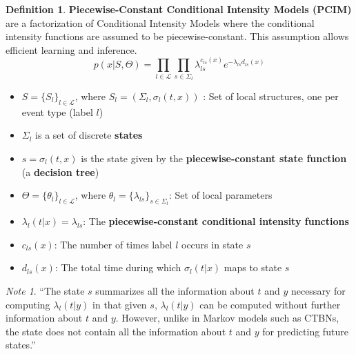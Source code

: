 \documentclass[12pt]{article}
\theoremstyle{plain}
\theoremstyle{definition}
\newtheorem{definition}{Definition}
\theoremstyle{remark}
\newtheorem*{note}{Note}
\begin{document}

\begin{definition}
  \textbf{Piecewise-Constant Conditional Intensity Models (PCIM)} are
  a factorization of Conditional Intensity Models where the conditional
  intensity functions are assumed to be piecewise-constant. This assumption
  allows efficient learning and inference.
  \begin{equation*}
    p(x|S,\Theta) = \prod_{l\in\mathcal{L}}\prod_{s\in\Sigma_l}\lambda_{ls}^{c_{ls}(x)}
    e^{-\lambda_{ls}d_{ls}(x)}
  \end{equation*}
  \begin{itemize}
    \item $S=\{S_l\}_{l\in\mathcal{L}}$, where $S_l=\left(\Sigma_l,\sigma_l(t,x)\right)$
      : Set of local structures, one per event type (label $l$)
    \item $\Sigma_l$ is a set of discrete \textbf{states}
    \item $s=\sigma_l(t,x)$ is the state given by the
      \textbf{piecewise-constant state function} (a \textbf{decision tree})
    \item $\Theta=\{\theta_l\}_{l\in\mathcal{L}}$,
      where $\theta_l=\{\lambda_{ls}\}_{s\in\Sigma_l}$: Set of local parameters
    \item $\lambda_l(t|x)=\lambda_{ls}$:
      The \textbf{piecewise-constant conditional intensity functions}
    \item $c_{ls}(x)$: The number of times label $l$ occurs in state $s$
    \item $d_{ls}(x)$: The total time during which $\sigma_l(t|x)$ maps to state $s$
  \end{itemize}
\end{definition}

\begin{note}
  ``The state $s$ summarizes all the information about $t$ and $y$ necessary for
  computing $\lambda_l(t|y)$ in that given $s$, $\lambda_l(t|y)$ can be
  computed without further information about $t$ and $y$.
  However, unlike in Markov models such as CTBNs, the state does not contain
  all the information about $t$ and $y$ for predicting future states.''
  \citep{pargunmee12}
\end{note}
\end{document}
